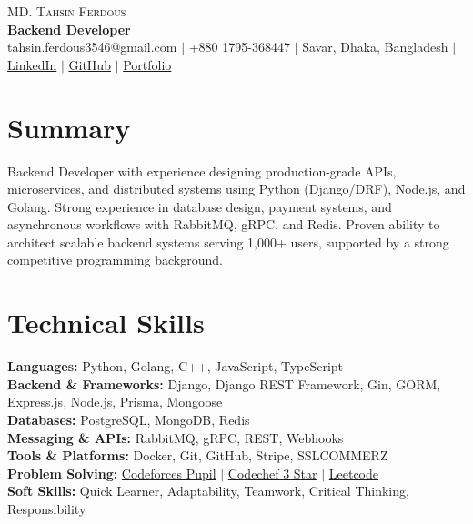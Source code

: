 \documentclass[letterpaper,10.5pt]{article}
\begin{document}
\begin{center}
    {\LARGE \scshape MD. Tahsin Ferdous} \\ \vspace{4pt}
    {\large\bfseries Backend Developer} \\ \vspace{6pt}
    \small
    tahsin.ferdous3546@gmail.com $|$
    +880 1795-368447 $|$
    Savar, Dhaka, Bangladesh $|$
    \href{https://www.linkedin.com/in/md-tahsin-ferdous/}{LinkedIn} $|$
    \href{https://github.com/tahsin005}{GitHub} $|$
    \href{https://tahsin-exe.vercel.app/}{Portfolio}
\end{center}

\section{Summary}
\small{
Backend Developer with experience designing production-grade APIs, microservices, and distributed systems using {Python (Django/DRF), Node.js, and Golang}. Strong experience in database design, payment systems, and asynchronous workflows with {RabbitMQ}, {gRPC}, and {Redis}. Proven ability to architect scalable backend systems serving 1,000+ users, supported by a strong competitive programming background.
}


\section{Technical Skills}
 \begin{itemize}[leftmargin=0.15in, label={}]
    \small{\item{
     \textbf{Languages:}{ Python, Golang, C++, JavaScript, TypeScript} \\[2pt]
     \textbf{Backend \& Frameworks:}{ Django, Django REST Framework, Gin, GORM, Express.js, Node.js, Prisma, Mongoose} \\[2pt]
     \textbf{Databases:}{ PostgreSQL, MongoDB, Redis} \\[2pt]
     \textbf{Messaging \& APIs:}{ RabbitMQ, gRPC, REST, Webhooks} \\[2pt]
     \textbf{Tools \& Platforms:}{ Docker, Git, GitHub, Stripe, SSLCOMMERZ} \\[2pt]
     \textbf{Problem Solving:} \href{https://codeforces.com/profile/tahsin_ferdous}{Codeforces Pupil} $|$  \href{https://www.codechef.com/users/tahsinferdous3}{Codechef 3 Star}  $|$  \href{https://leetcode.com/u/md-tahsin-ferdous/}{Leetcode} \\[2pt]
     \textbf{Soft Skills:}{ Quick Learner, Adaptability, Teamwork, Critical Thinking, Responsibility}
    }}
 \end{itemize}
\end{document}
